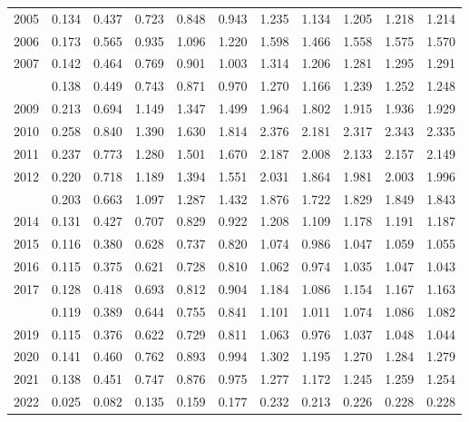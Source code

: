 \documentclass[
]{article}
\begin{document}
\begin{longtable}[t]{lrrrrrrrrrr}
2005 & 0.134 & 0.437 & 0.723 & 0.848 & 0.943 & 1.235 & 1.134 & 1.205 & 1.218 & 1.214\\
2006 & 0.173 & 0.565 & 0.935 & 1.096 & 1.220 & 1.598 & 1.466 & 1.558 & 1.575 & 1.570\\
2007 & 0.142 & 0.464 & 0.769 & 0.901 & 1.003 & 1.314 & 1.206 & 1.281 & 1.295 & 1.291\\
\addlinespace
2008 & 0.138 & 0.449 & 0.743 & 0.871 & 0.970 & 1.270 & 1.166 & 1.239 & 1.252 & 1.248\\
2009 & 0.213 & 0.694 & 1.149 & 1.347 & 1.499 & 1.964 & 1.802 & 1.915 & 1.936 & 1.929\\
2010 & 0.258 & 0.840 & 1.390 & 1.630 & 1.814 & 2.376 & 2.181 & 2.317 & 2.343 & 2.335\\
2011 & 0.237 & 0.773 & 1.280 & 1.501 & 1.670 & 2.187 & 2.008 & 2.133 & 2.157 & 2.149\\
2012 & 0.220 & 0.718 & 1.189 & 1.394 & 1.551 & 2.031 & 1.864 & 1.981 & 2.003 & 1.996\\
\addlinespace
2013 & 0.203 & 0.663 & 1.097 & 1.287 & 1.432 & 1.876 & 1.722 & 1.829 & 1.849 & 1.843\\
2014 & 0.131 & 0.427 & 0.707 & 0.829 & 0.922 & 1.208 & 1.109 & 1.178 & 1.191 & 1.187\\
2015 & 0.116 & 0.380 & 0.628 & 0.737 & 0.820 & 1.074 & 0.986 & 1.047 & 1.059 & 1.055\\
2016 & 0.115 & 0.375 & 0.621 & 0.728 & 0.810 & 1.062 & 0.974 & 1.035 & 1.047 & 1.043\\
2017 & 0.128 & 0.418 & 0.693 & 0.812 & 0.904 & 1.184 & 1.086 & 1.154 & 1.167 & 1.163\\
\addlinespace
2018 & 0.119 & 0.389 & 0.644 & 0.755 & 0.841 & 1.101 & 1.011 & 1.074 & 1.086 & 1.082\\
2019 & 0.115 & 0.376 & 0.622 & 0.729 & 0.811 & 1.063 & 0.976 & 1.037 & 1.048 & 1.044\\
2020 & 0.141 & 0.460 & 0.762 & 0.893 & 0.994 & 1.302 & 1.195 & 1.270 & 1.284 & 1.279\\
2021 & 0.138 & 0.451 & 0.747 & 0.876 & 0.975 & 1.277 & 1.172 & 1.245 & 1.259 & 1.254\\
2022 & 0.025 & 0.082 & 0.135 & 0.159 & 0.177 & 0.232 & 0.213 & 0.226 & 0.228 & 0.228\\*
\end{longtable}
\end{document}
